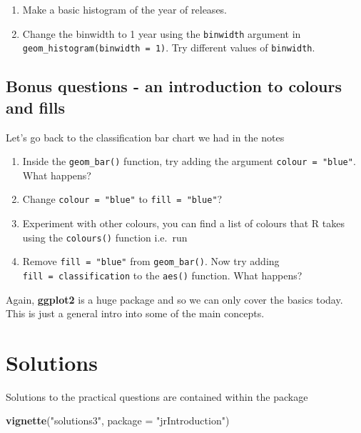 \documentclass[]{tufte-handout}
\newenvironment{Shaded}{}{}
\newcommand{\DataTypeTok}[1]{\textcolor[rgb]{0.56,0.13,0.00}{#1}}
\newcommand{\KeywordTok}[1]{\textcolor[rgb]{0.00,0.44,0.13}{\textbf{#1}}}
\newcommand{\NormalTok}[1]{#1}
\newcommand{\StringTok}[1]{\textcolor[rgb]{0.25,0.44,0.63}{#1}}
\begin{document}
\begin{enumerate}
\def\labelenumi{\arabic{enumi}.}
\item
  Make a basic histogram of the year of releases.
\item
  Change the binwidth to 1 year using the \texttt{binwidth} argument in
  \texttt{geom\_histogram(binwidth\ =\ 1)}. Try different values of
  \texttt{binwidth}.
\end{enumerate}

\hypertarget{bonus-questions---an-introduction-to-colours-and-fills}{%
\subsection{Bonus questions - an introduction to colours and
fills}\label{bonus-questions---an-introduction-to-colours-and-fills}}

Let's go back to the classification bar chart we had in the notes

\begin{enumerate}
\def\labelenumi{\arabic{enumi}.}
\item
  Inside the \texttt{geom\_bar()} function, try adding the argument
  \texttt{colour\ =\ "blue"}. What happens?
\item
  Change \texttt{colour\ =\ "blue"} to \texttt{fill\ =\ "blue"}?
\item
  Experiment with other colours, you can find a list of colours that R
  takes using the \texttt{colours()} function i.e.~run
\item
  Remove \texttt{fill\ =\ "blue"} from \texttt{geom\_bar()}. Now try
  adding \texttt{fill\ =\ classification} to the \texttt{aes()}
  function. What happens?
\end{enumerate}

Again, \textbf{ggplot2} is a huge package and so we can only cover the
basics today. This is just a general intro into some of the main
concepts.

\hypertarget{solutions}{%
\section{Solutions}\label{solutions}}

Solutions to the practical questions are contained within the package

\begin{Shaded}
\begin{Highlighting}[]
\KeywordTok{vignette}\NormalTok{(}\StringTok{"solutions3"}\NormalTok{, }\DataTypeTok{package =} \StringTok{"jrIntroduction"}\NormalTok{)}
\end{Highlighting}
\end{Shaded}
\end{document}
